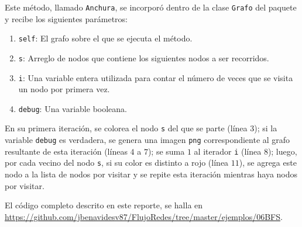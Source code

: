 \documentclass{article}
\begin{document}
  Este método, llamado \texttt{Anchura}, se incorporó dentro de la clase \texttt{Grafo} del paquete y recibe los siguientes parámetros:
  \begin{enumerate}
    \item \texttt{self}: El grafo sobre el que se ejecuta el método.
    \item \texttt{s}: Arreglo de nodos que contiene los siguientes nodos a ser recorridos.
    \item \texttt{i}: Una variable entera utilizada para contar el número de veces que se visita un nodo por primera vez.
    \item \texttt{debug}: Una variable booleana.
  \end{enumerate}

  En su primera iteración, se colorea el nodo \texttt{s} del que se parte (línea $3$); si la variable \texttt{debug} es verdadera, se genera una imagen \texttt{png} correspondiente al grafo resultante de esta iteración (líneas $4$ a $7$); se suma $1$ al iterador \texttt{i} (línea $8$); luego, por cada vecino del nodo \texttt{s}, si su color es distinto a rojo (línea $11$), se agrega este nodo a la lista de nodos por visitar y se repite esta iteración mientras haya nodos por visitar.

  El código completo descrito en este reporte, se halla en \url{https://github.com/jbenavidesv87/FlujoRedes/tree/master/ejemplos/06BFS}.

  
  
\end{document}
